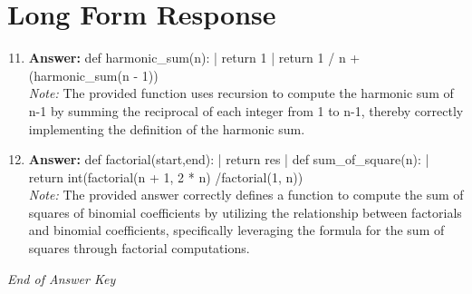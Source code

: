 \documentclass[12pt]{article}
\begin{document}
\section*{Long Form Response}
\begin{enumerate}[label=\arabic*.]
\setcounter{enumi}{10}
\item \textbf{Answer:} def harmonic\_sum(n): | return 1 | return 1 / n + (harmonic\_sum(n - 1))
\\ \textit{Note:} The provided function uses recursion to compute the harmonic sum of n-1 by summing the reciprocal of each integer from 1 to n-1, thereby correctly implementing the definition of the harmonic sum.
\item \textbf{Answer:} def factorial(start,end): | return res | def sum\_of\_square(n): | return int(factorial(n + 1, 2 * n) /factorial(1, n))
\\ \textit{Note:} The provided answer correctly defines a function to compute the sum of squares of binomial coefficients by utilizing the relationship between factorials and binomial coefficients, specifically leveraging the formula for the sum of squares through factorial computations.
\end{enumerate}

\vfill
\noindent\textit{End of Answer Key}
\end{document}
